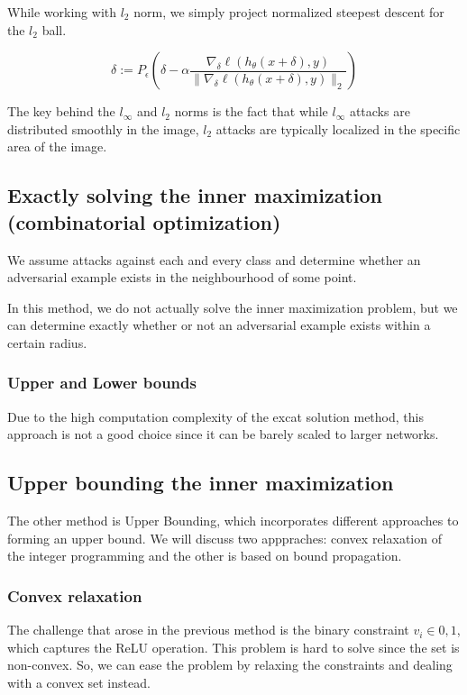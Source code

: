 While working with $l_2$ norm, we simply project normalized steepest descent for the $l_2$ ball. 

\[\delta := P_{\epsilon}\left(\delta - \alpha \frac{\nabla_{\delta} \ell(h_{\theta}(x + \delta), y)}{\|\nabla_{\delta} \ell(h_{\theta}(x + \delta), y)\|_2}\right)\]

The key behind the $l_\infty$ and $l_2$ norms is the fact that while $l_\infty$ attacks are distributed smoothly in the image, 
$l_2$ attacks are typically localized in the specific area of the image. 




\subsection{Exactly solving the inner maximization (combinatorial optimization)}

We assume attacks against each and every class and determine whether an 
adversarial example exists in the neighbourhood of some point.

In this method, we do not actually solve the inner maximization problem, but we can determine exactly whether or not an adversarial
example exists within a certain radius. 



\subsubsection{Upper and Lower bounds}

Due to the high computation complexity of the excat solution method, this approach is not a good choice since it can be barely scaled to larger networks. 

\subsection{Upper bounding the inner maximization}


The other method is Upper Bounding, which incorporates different approaches to forming an upper bound. We will discuss two apppraches: convex relaxation of the integer programming and the other 
is based on bound propagation.

\subsubsection{Convex relaxation}

The challenge that arose in the previous method is the binary constraint $v_i \in {0, 1}$, which 
captures the ReLU operation. This problem is hard to solve since the set is non-convex. 
So, we can ease the problem by relaxing the constraints and dealing with a convex set instead.

